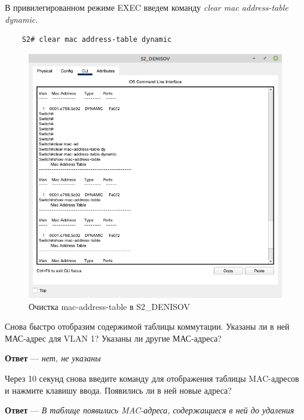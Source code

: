 \documentclass[a4paper,14pt]{extarticle}
\begin{document}
В привилегированном режиме EXEC введем команду\textit{ clear mac address-table dynamic}.
\begin{lstlisting}
	S2# clear mac address-table dynamic
\end{lstlisting}

\begin{figure}[h!]
	\centering
	\includegraphics[width=0.6\linewidth]{images/clear-mac-s2}
	\caption{Очистка mac-address-table в S2\_DENISOV}
	\label{fig:clear-mac-s2}
\end{figure}
Снова быстро отобразим содержимой таблицы коммутации. 
Указаны ли в ней МАС-адрес для
VLAN 1? Указаны ли другие МАС-адреса?

\textbf{Ответ} --- \textit{нет, не указаны}

Через 10 секунд снова введите команду для отображения таблицы MAC-адресов и нажмите
клавишу ввода. Появились ли в ней новые адреса?

\textbf{Ответ} --- \textit{В таблице появились MAC-адреса, содержащиеся в ней до удаления}
\end{document}
